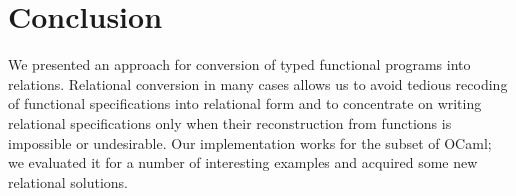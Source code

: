 \section{Conclusion}
\label{conclusion}

We presented an approach for conversion of typed functional programs into relations. Relational conversion 
in many cases allows us to avoid tedious recoding of functional specifications into relational form and to 
concentrate on writing relational specifications only when their reconstruction from functions is impossible or 
undesirable. Our implementation works for the subset of OCaml; we evaluated it for a number of interesting 
examples and acquired some new relational solutions.


